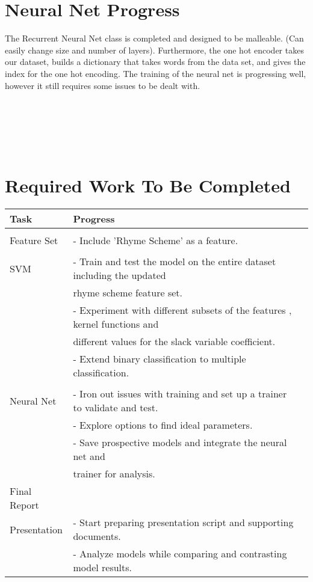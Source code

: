 \documentclass[journal]{IEEEtran}
\begin{document}
\section{Neural Net Progress}

The Recurrent Neural Net class is completed and designed to be malleable. (Can easily change size and number of layers). Furthermore, the one hot encoder takes our dataset, builds a dictionary that takes words from the data set, and gives the index for the one hot encoding. The training of the neural net is progressing well, however it still requires some issues to be dealt with.
\\ \\ \\ \\ \\ \\

\section{Required Work To Be Completed}

\begin{table}[h!]
  \begin{center}
    \label{tab:table1}
    \begin{tabular}{l|l|l|}
      \textbf{Task} & \textbf{Progress}\\

      \hline
\\
Feature Set
& - Include 'Rhyme Scheme' as a feature.\\
\\
SVM
& - Train and test the model on the entire dataset including the updated \\
& rhyme scheme feature set. \\
& - Experiment with different subsets of the features , kernel functions and \\
& different values for the slack variable coefficient.\\
& - Extend binary classification to multiple classification. \\
\\
Neural Net
& - Iron out issues with training and set up a trainer to validate and test. \\
& - Explore options to find ideal parameters. \\
& - Save prospective models and integrate the neural net and \\
&  trainer for analysis. \\
Final Report \\
Presentation & - Start preparing presentation script and supporting documents. \\
& - Analyze models while comparing and contrasting model results.


    \end{tabular}
  \end{center}
\end{table}
\end{document}
